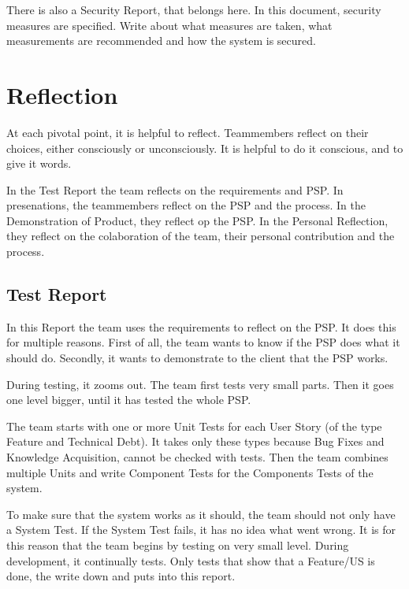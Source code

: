 \documentclass[10pt]{report}
\begin{document}
There is also a Security Report, that belongs here. In this document, security measures are specified. Write about what measures are taken, what measurements are recommended and how the system is secured.

\newpage

\chapter{Reflection}
\thispagestyle{fancy}

At each pivotal point, it is helpful to reflect. Teammembers reflect on their choices, either consciously or unconsciously. It is helpful to do it conscious, and to give it words.

In the Test Report the team reflects on the requirements and PSP. In presenations, the teammembers reflect on the PSP and the process. In the Demonstration of Product, they reflect op the PSP. In the Personal Reflection, they reflect on the colaboration of the team, their personal contribution and the process.

\medskip
\minitoc

\newpage

\section{Test Report}

In this Report the team uses the requirements to reflect on the PSP. It does this for multiple reasons. First of all, the team wants to know if the PSP does what it should do. Secondly, it wants to demonstrate to the client that the PSP works. 

During testing, it zooms out. The team first tests very small parts. Then it goes one level bigger, until it has tested the whole PSP.

The team starts with one or more Unit Tests for each User Story (of the type Feature and Technical Debt). It takes only these types because Bug Fixes and Knowledge Acquisition, cannot be checked with tests. Then the team combines multiple Units and write Component Tests for the Components Tests of the system. 

To make sure that the system works as it should, the team should not only have a System Test. If the System Test fails, it has no idea what went wrong. It is for this reason that the team begins by testing on very small level. During development, it continually tests. Only tests that show that a Feature/US is done, the write down and puts into this report.
\end{document}
